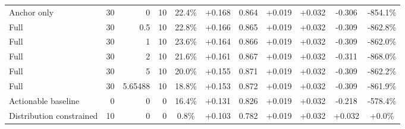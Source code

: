 \begin{table}[htbp]
\begin{tabular}{lrrrccccccc}
Anchor only & 30 & 0 & 10 & 22.4\% & +0.168 & 0.864 & +0.019 & +0.032 & -0.306 & -854.1\% \\
Full & 30 & 0.5 & 10 & 22.8\% & +0.166 & 0.865 & +0.019 & +0.032 & -0.309 & -862.8\% \\
Full & 30 & 1 & 10 & 23.6\% & +0.164 & 0.866 & +0.019 & +0.032 & -0.309 & -862.0\% \\
Full & 30 & 2 & 10 & 21.6\% & +0.161 & 0.867 & +0.019 & +0.032 & -0.311 & -868.0\% \\
Full & 30 & 5 & 10 & 20.0\% & +0.155 & 0.871 & +0.019 & +0.032 & -0.309 & -862.2\% \\
Full & 30 & 5.65488 & 10 & 18.8\% & +0.153 & 0.872 & +0.019 & +0.032 & -0.309 & -861.9\% \\
Actionable baseline & 0 & 0 & 0 & 16.4\% & +0.131 & 0.826 & +0.019 & +0.032 & -0.218 & -578.4\% \\
Distribution constrained & 10 & 0 & 0 & 0.8\% & +0.103 & 0.782 & +0.019 & +0.032 & +0.032 & +0.0\% \\
\bottomrule
\end{tabular}
\end{table}
